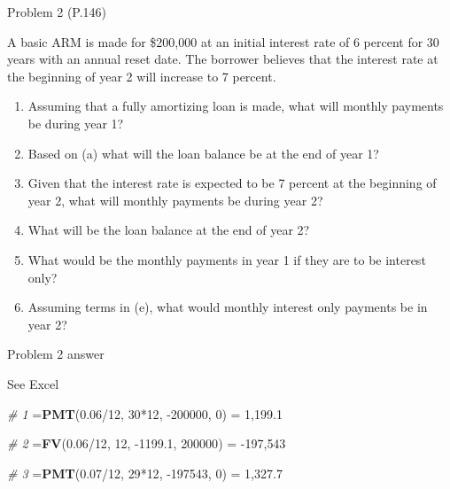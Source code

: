 \documentclass[ignorenonframetext,]{beamer}
\newenvironment{Shaded}{\begin{snugshade}}{\end{snugshade}}
\newcommand{\KeywordTok}[1]{\textcolor[rgb]{0.13,0.29,0.53}{\textbf{{#1}}}}
\newcommand{\DecValTok}[1]{\textcolor[rgb]{0.00,0.00,0.81}{{#1}}}
\newcommand{\FloatTok}[1]{\textcolor[rgb]{0.00,0.00,0.81}{{#1}}}
\newcommand{\StringTok}[1]{\textcolor[rgb]{0.31,0.60,0.02}{{#1}}}
\newcommand{\CommentTok}[1]{\textcolor[rgb]{0.56,0.35,0.01}{\textit{{#1}}}}
\newcommand{\NormalTok}[1]{{#1}}
\providecommand{\tightlist}{%
\setlength{\itemsep}{0pt}\setlength{\parskip}{0pt}}
\begin{document}
\begin{frame}{Problem 2 (P.146)}

\small

A basic ARM is made for \$200,000 at an initial interest rate of 6
percent for 30 years with an annual reset date. The borrower believes
that the interest rate at the beginning of year 2 will increase to 7
percent.

\begin{enumerate}
\def\labelenumi{\alph{enumi}.}
\tightlist
\item
  Assuming that a fully amortizing loan is made, what will monthly
  payments be during year 1?
\item
  Based on (a) what will the loan balance be at the end of year 1?
\item
  Given that the interest rate is expected to be 7 percent at the
  beginning of year 2, what will monthly payments be during year 2?
\item
  What will be the loan balance at the end of year 2?
\item
  What would be the monthly payments in year 1 if they are to be
  interest only?
\item
  Assuming terms in (e), what would monthly interest only payments be in
  year 2?
\end{enumerate}

\end{frame}

\begin{frame}[fragile]{Problem 2 answer}

\begin{Shaded}
\begin{Highlighting}[]
\NormalTok{See Excel}

\CommentTok{# 1}
\NormalTok{=}\KeywordTok{PMT}\NormalTok{(}\FloatTok{0.06}\NormalTok{/}\DecValTok{12}\NormalTok{, }\DecValTok{30}\NormalTok{*}\DecValTok{12}\NormalTok{, -}\DecValTok{200000}\NormalTok{, }\DecValTok{0}\NormalTok{) =}\StringTok{ }\DecValTok{1}\NormalTok{,}\FloatTok{199.1}

\CommentTok{# 2}
\NormalTok{=}\KeywordTok{FV}\NormalTok{(}\FloatTok{0.06}\NormalTok{/}\DecValTok{12}\NormalTok{, }\DecValTok{12}\NormalTok{, -}\FloatTok{1199.1}\NormalTok{, }\DecValTok{200000}\NormalTok{) =}\StringTok{ }\NormalTok{-}\DecValTok{197}\NormalTok{,}\DecValTok{543}

\CommentTok{# 3}
\NormalTok{=}\KeywordTok{PMT}\NormalTok{(}\FloatTok{0.07}\NormalTok{/}\DecValTok{12}\NormalTok{, }\DecValTok{29}\NormalTok{*}\DecValTok{12}\NormalTok{, -}\DecValTok{197543}\NormalTok{, }\DecValTok{0}\NormalTok{) =}\StringTok{ }\DecValTok{1}\NormalTok{,}\FloatTok{327.7}
\end{Highlighting}
\end{Shaded}

\end{frame}
\end{document}
